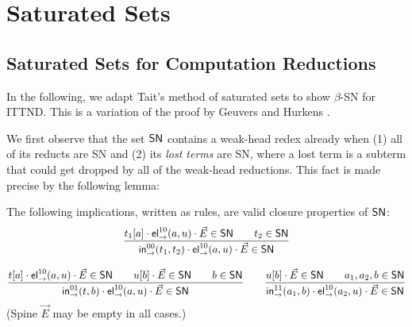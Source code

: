 \section{Saturated Sets}
\label{sec:sat}

\subsection{Saturated Sets for Computation Reductions}

In the following, we adapt Tait's method of saturated sets to show $\beta$-SN
for ITTND.  This is a variation of the proof by Geuvers and Hurkens
\cite{geuversHurkens:types17}.

We first observe that the set $\mathsf{SN}$ contains a weak-head
redex already when (1) all of its reducts are SN and (2) its \emph{lost terms}
are SN, where a lost term is a subterm that could get dropped by all of the
weak-head reductions.
This fact is made precise by the following lemma:
\begin{lemma}
  \label{lem:clos-sn}
  The following implications, written as rules, are valid closure
  properties of $\mathsf{SN}$:
\begin{gather*}
  \dfrac{t_1[a] \cdot \mathsf{el}_{\to}^{10}(a,u) \cdot \vec E \in \mathsf{SN}
      \qquad
      t_2 \in \mathsf{SN}
    }{\mathsf{in}_{\to}^{00}(t_1,t_2) \cdot \mathsf{el}_{\to}^{10}(a,u) \cdot \vec E \in \mathsf{SN}}
\\[2ex]
  \dfrac{t[a] \cdot \mathsf{el}_{\to}^{10}(a,u) \cdot \vec E \in \mathsf{SN}
      \qquad
      u[b] \cdot \vec E \in \mathsf{SN}
      \qquad
      b \in \mathsf{SN}
    }{\mathsf{in}_{\to}^{01}(t,b) \cdot \mathsf{el}_{\to}^{10}(a,u) \cdot \vec E \in \mathsf{SN}}
\qquad
  \dfrac{u[b] \cdot \vec E \in \mathsf{SN}
      \qquad
      a_1,a_2,b \in \mathsf{SN}
    }{\mathsf{in}_{\to}^{11}(a_1,b) \cdot \mathsf{el}_{\to}^{10}(a_2,u) \cdot \vec E \in \mathsf{SN}}
\end{gather*}
(Spine $\vec E$ may be empty in all cases.)
\end{lemma}
